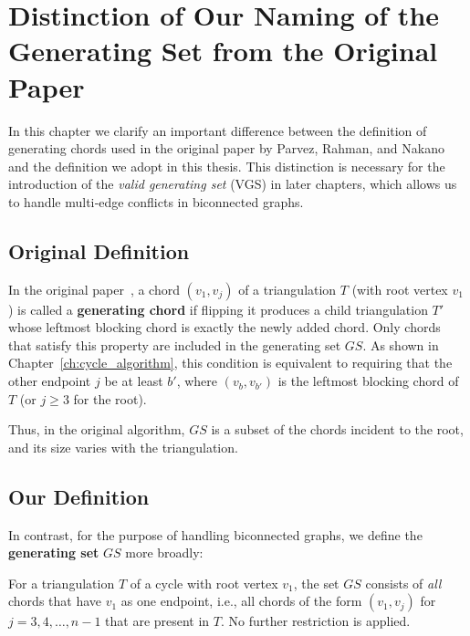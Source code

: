 
\chapter{Distinction of Our Naming of the Generating Set from the Original Paper}
\label{ch:gs_distinction}

In this chapter we clarify an important difference between the definition of generating chords used in the original paper by Parvez, Rahman, and Nakano~\cite{parvez2011} and the definition we adopt in this thesis. 
This distinction is necessary for the introduction of the \emph{valid generating set} (VGS) in later chapters, which allows us to handle multi‑edge conflicts in biconnected graphs.

\section{Original Definition}
\label{sec:original_gs}

In the original paper~\cite{parvez2011}, a chord \((v_1, v_j)\) of a triangulation \(T\) (with root vertex \(v_1\)) is called a \textbf{generating chord} if flipping it produces a child triangulation \(T'\) whose leftmost blocking chord is exactly the newly added chord. 
Only chords that satisfy this property are included in the generating set \(GS\). 
As shown in Chapter~\ref{ch:cycle_algorithm}, this condition is equivalent to requiring that the other endpoint \(j\) be at least \(b'\), where \((v_b, v_{b'})\) is the leftmost blocking chord of \(T\) (or \(j \ge 3\) for the root).

Thus, in the original algorithm, \(GS\) is a subset of the chords incident to the root, and its size varies with the triangulation.

\section{Our Definition}
\label{sec:our_gs}

In contrast, for the purpose of handling biconnected graphs, we define the \textbf{generating set} \(GS\) more broadly:

\begin{definition}
    \label{def:our_gs}
    For a triangulation \(T\) of a cycle with root vertex \(v_1\), the set \(GS\) consists of \emph{all} chords that have \(v_1\) as one endpoint, i.e., all chords of the form \((v_1, v_j)\) for \(j = 3, 4, \dots, n-1\) that are present in \(T\). 
    No further restriction is applied.
\end{definition}

